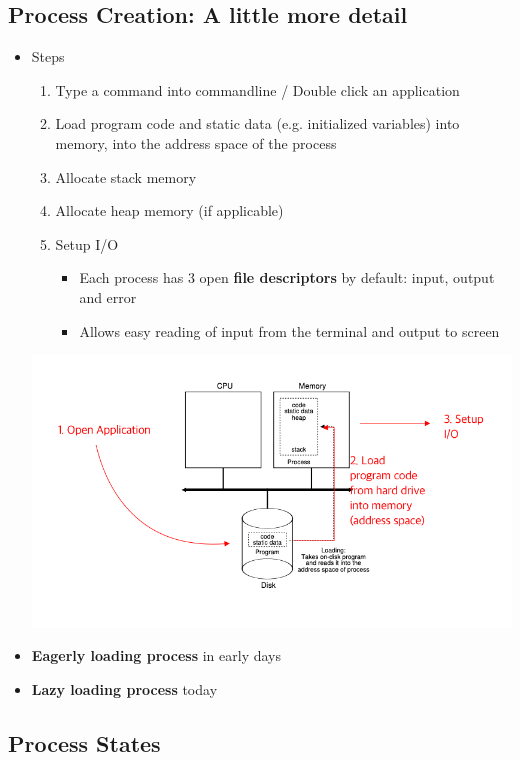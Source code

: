 \documentclass[12pt]{article}
\begin{document}
\subsection{Process Creation: A little more detail}


\begin{itemize}
    \item Steps
    \begin{enumerate}[1.]
        \item Type a command into commandline / Double click an application
        \item Load program code and static data (e.g. initialized variables) into
        memory, into the address space of the process
        \item Allocate stack memory
        \item Allocate heap memory (if applicable)
        \item Setup I/O
        \begin{itemize}
            \item Each process has 3 open \textbf{file descriptors} by default:
            input, output and error
            \item Allows easy reading of input from the terminal and output to screen
        \end{itemize}
    \end{enumerate}

    \begin{center}
    \includegraphics[width=0.9\linewidth]{images/notes_4_6.png}
    \end{center}

    \item \textbf{Eagerly loading process} in early days
    \item \textbf{Lazy loading process} today
\end{itemize}
\subsection{Process States}
\end{document}
